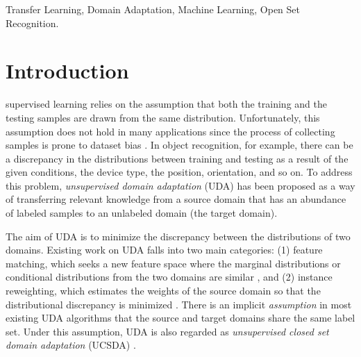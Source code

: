 \documentclass[journal]{IEEEtran}
\begin{document}
\begin{IEEEkeywords}
Transfer Learning, Domain Adaptation, Machine Learning, Open Set Recognition.
\end{IEEEkeywords}






\IEEEpeerreviewmaketitle



\section{Introduction}


 supervised learning relies on the assumption that both the training and the testing samples are drawn from the same distribution. Unfortunately, this assumption does not hold in many applications since the process of collecting samples is prone to dataset bias \cite{candela2009dataset,DBLP:journals/kbs/LuBHZXZ15}. In object recognition, for example, there can be a discrepancy in the distributions between training and testing as a result of the given conditions, the device type, the position, orientation, and so on. To address this problem, \emph{unsupervised domain adaptation} (UDA) \cite{pan2008transfer,pan2010survey} has been proposed as a way of transferring relevant knowledge from a source domain that has an abundance of labeled samples to an unlabeled domain (the target domain). 

The aim of UDA is to minimize the discrepancy between the distributions of two domains. Existing work on UDA falls into two main categories: (1) feature matching, which seeks a new feature space where the marginal distributions or conditional distributions from the two domains are similar \cite{pan2011domain,long2013transfer,long2014transfer}, and (2) instance reweighting, which estimates the weights of the source domain so that the distributional discrepancy is minimized \cite{huang2007correcting,yu2012analysis}. There is an implicit \textit{assumption} in most existing UDA algorithms \cite{DBLP:journals/tnn/WeiKG19,DBLP:journals/tnn/LiSH17,DBLP:journals/tnn/PassalisT19,DBLP:conf/ijcnn/Fang00019,DBLP:journals/tfs/LiuLZ18,DBLP:journals/tnnls/LiuLZ20,DBLP:journals/tfs/ZuoZPBL17}  that {the source and target domains share the same label set}. Under this assumption, UDA is also regarded as \textit{unsupervised closed set domain adaptation} (UCSDA) \cite{DBLP:conf/iccv/BustoG17}. 
\end{document}
